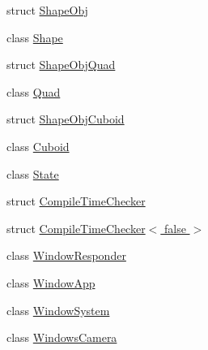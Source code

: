 \begin{DoxyCompactItemize}
struct \hyperlink{structs9_1_1ShapeObj}{\-Shape\-Obj}
\item 
class \hyperlink{classs9_1_1Shape}{\-Shape}
\item 
struct \hyperlink{structs9_1_1ShapeObjQuad}{\-Shape\-Obj\-Quad}
\item 
class \hyperlink{classs9_1_1Quad}{\-Quad}
\item 
struct \hyperlink{structs9_1_1ShapeObjCuboid}{\-Shape\-Obj\-Cuboid}
\item 
class \hyperlink{classs9_1_1Cuboid}{\-Cuboid}
\item 
class \hyperlink{classs9_1_1State}{\-State}
\item 
struct \hyperlink{structs9_1_1CompileTimeChecker}{\-Compile\-Time\-Checker}
\item 
struct \hyperlink{structs9_1_1CompileTimeChecker_3_01false_01_4}{\-Compile\-Time\-Checker$<$ false $>$}
\item 
class \hyperlink{classs9_1_1WindowResponder}{\-Window\-Responder}
\item 
class \hyperlink{classs9_1_1WindowApp}{\-Window\-App}
\item 
class \hyperlink{classs9_1_1WindowSystem}{\-Window\-System}
\item 
class \hyperlink{classs9_1_1WindowsCamera}{\-Windows\-Camera}
\end{DoxyCompactItemize}
